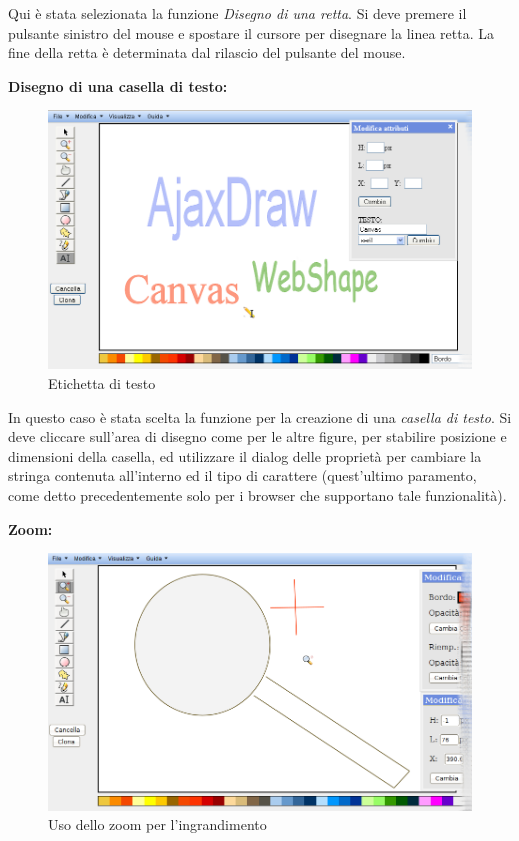 \vspace{50pt}
Qui \`e stata selezionata la funzione \textit{Disegno di una retta}. Si deve premere il pulsante sinistro del mouse e spostare il cursore per disegnare la linea retta. La fine della retta \`e determinata dal rilascio del pulsante del mouse.
 
\newpage
\textbf{Disegno di una casella di testo:}\\ 
\begin{figure}[!ht]
\centering
\includegraphics[scale=0.5]{images/label.png}
\caption{Etichetta di testo}
\end{figure}
 
 
\vspace{100pt}
In questo caso \`e stata scelta la funzione per la creazione di una \textit{casella di testo}. Si deve cliccare sull'area di disegno come per le altre figure, per stabilire posizione e dimensioni della casella, ed utilizzare il dialog delle propriet\`a per cambiare la stringa contenuta all'interno ed il tipo di carattere (quest'ultimo paramento, come detto precedentemente solo per i browser che supportano tale funzionalit\` a).
\newpage
 
\textbf{Zoom:}
\begin{figure}[!ht]
\centering
\includegraphics[scale=0.4]{images/zoom_piu.png}
\caption{Uso dello zoom per l'ingrandimento}
\end{figure}
 
